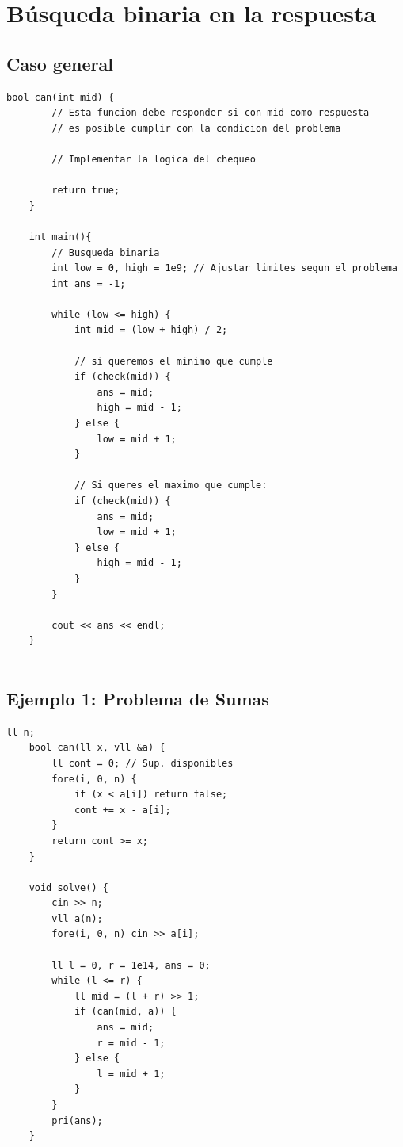 \section{Búsqueda binaria en la respuesta}
\subsection{Caso general}
\begin{lstlisting}[style=cppstyle, caption={Busqueda binaria en la respuesta}]
	bool can(int mid) {
		// Esta funcion debe responder si con mid como respuesta
		// es posible cumplir con la condicion del problema
		
		// Implementar la logica del chequeo
		
		return true;
	}
	
	int main(){
		// Busqueda binaria
		int low = 0, high = 1e9; // Ajustar limites segun el problema
		int ans = -1;
		
		while (low <= high) {
			int mid = (low + high) / 2;
			
			// si queremos el minimo que cumple
			if (check(mid)) {
				ans = mid;        
				high = mid - 1;
			} else {
				low = mid + 1;
			}
			
			// Si queres el maximo que cumple:
			if (check(mid)) {
				ans = mid;
				low = mid + 1;
			} else {
				high = mid - 1;
			}
		}
		
		cout << ans << endl;
	}
	
\end{lstlisting}

\subsection{Ejemplo 1: Problema de Sumas}
\begin{lstlisting}[style=cppstyle, caption={Problema de sumas con búsqueda binaria}]
	ll n;
	bool can(ll x, vll &a) {
		ll cont = 0; // Sup. disponibles
		fore(i, 0, n) {
			if (x < a[i]) return false; 
			cont += x - a[i];
		}
		return cont >= x;
	}
	
	void solve() {
		cin >> n; 
		vll a(n); 
		fore(i, 0, n) cin >> a[i]; 
		
		ll l = 0, r = 1e14, ans = 0;
		while (l <= r) {
			ll mid = (l + r) >> 1; 
			if (can(mid, a)) {
				ans = mid; 
				r = mid - 1;
			} else {
				l = mid + 1;
			}
		} 
		pri(ans);
	}
\end{lstlisting}

